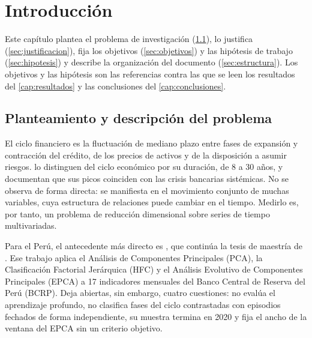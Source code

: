 \chapter{Introducción}
\label{cap:introduccion}

Este capítulo plantea el problema de investigación (\cref{sec:planteamiento}), lo justifica
(\cref{sec:justificacion}), fija los objetivos (\cref{sec:objetivos}) y las hipótesis de trabajo
(\cref{sec:hipotesis}) y describe la organización del documento (\cref{sec:estructura}). Los
objetivos y las hipótesis son las referencias contra las que se leen los resultados del
\cref{cap:resultados} y las conclusiones del \cref{cap:conclusiones}.

\section{Planteamiento y descripción del problema}
\label{sec:planteamiento}

El ciclo financiero es la fluctuación de mediano plazo entre fases de expansión y contracción
del crédito, de los precios de activos y de la disposición a asumir riesgos.
\textcite{drehmann_borio_tsatsaronis_2012} lo distinguen del ciclo económico por su duración, de
8 a 30 años, y documentan que sus picos coinciden con las crisis bancarias sistémicas. No se
observa de forma directa: se manifiesta en el movimiento conjunto de muchas variables, cuya
estructura de relaciones puede cambiar en el tiempo. Medirlo es, por tanto, un problema de
reducción dimensional sobre series de tiempo multivariadas.

Para el Perú, el antecedente más directo es
\textcite{camiz_cerda_atoche_2026}, que
continúa la tesis de maestría de \textcite{atoche_murrieta_2022}. Ese trabajo aplica el Análisis de Componentes Principales (PCA), la
Clasificación Factorial Jerárquica (HFC) y el Análisis Evolutivo de Componentes Principales
(EPCA) a 17 indicadores mensuales del Banco Central de Reserva del Perú (BCRP). Deja abiertas,
sin embargo, cuatro cuestiones: no evalúa el aprendizaje profundo, no clasifica fases del ciclo
contrastadas con episodios fechados de forma independiente, su muestra termina en 2020 y fija
el ancho de la ventana del EPCA sin un criterio objetivo.

